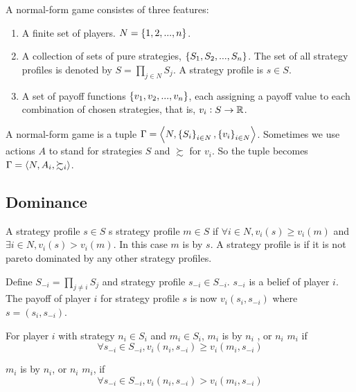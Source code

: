 \begin{definition}
    A normal-form game consistes of three features:
    \begin{enumerate}
        \item A finite set of players. $N = \set{1, 2, ... , n}$.
        \item A collection of sets of pure strategies, $\set{S_1, S_2, ... , S_n}$. The set of all strategy profiles is denoted by $\displaystyle S = \prod_{j \in N} S_j$. A strategy profile is $s \in S$.
        \item A set of payoff functions $\set{v_1, v_2, ..., v_n}$, each assigning a payoff value to each combination of chosen strategies, that is, $\displaystyle v_i : S \rightarrow \mathbb{R} $.
    \end{enumerate}
    
    A normal-form game is a tuple $\Gamma = \mleft\langle N, \set{S_i}_{i \in N}, \set{v_i}_{i \in N} \mright\rangle$. Sometimes we use actions $A$ to stand for strategies $S$ and $\succsim$ for $v_i$. So the tuple becomes $\Gamma = \mleft\langle N, A_i, \succsim_i \mright\rangle$.
\end{definition}

\subsection{Dominance}

\begin{definition}
    A strategy profile $s \in S$ s strategy profile $m \in S$ if $\forall i \in N, v_i(s) \geq v_i(m)$ and $\exists i \in N, v_i(s) > v_i(m)$. In this case $m$ is  by $s$. A strategy profile is  if it is not pareto dominated by any other strategy profiles.
\end{definition}

\begin{definition}
    Define $\displaystyle S_{-i} = \prod_{j \neq i} S_j$ and strategy profile $s_{-i} \in S_{-i}$. $s_{-i}$ is a belief of player $i$. The payoff of player $i$ for strategy profile $s$ is now $v_i(s_i, s_{-i})$ where $s = (s_i, s_{-i})$.
\end{definition}

\begin{definition}
    For player $i$ with strategy $n_i \in S_i$ and $m_i \in S_i$, $m_i$ is  by $n_i$ , or $n_i$ \cindex{$\succeq$} $m_i$ if 
    \begin{equation*}
       \forall s_{-i} \in S_{-i}, v_i (n_i, s_{-i}) \geq v_i (m_i, s_{-i})
    \end{equation*}
    
    $m_i$ is  by $n_i$, or $n_i$ \cindex{$\succ$} $m_i$, if 
    \begin{equation*}
       \forall s_{-i} \in S_{-i}, v_i (n_i, s_{-i}) > v_i (m_i, s_{-i})
    \end{equation*}
\end{definition}

